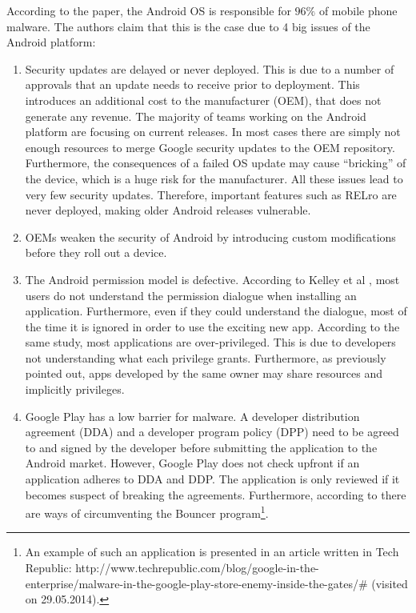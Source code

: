 According to the paper, the Android OS is responsible for $96\%$ of mobile phone malware. The authors claim that this is the case due to 4 big issues of the Android platform:
\begin{enumerate}
	\item Security updates are delayed or never deployed. This is due to a number of approvals that an update needs to receive prior to deployment. This introduces an additional cost to the manufacturer (OEM), that does not generate any revenue. The majority of teams working on the Android platform are focusing on current releases. In most cases there are simply not enough resources to merge Google security updates to the OEM repository. Furthermore, the consequences of a failed OS update may cause ``bricking'' of the device, which is a huge risk for the manufacturer. All these issues lead to very few security updates. Therefore, important features such as RELro are never deployed, making older Android releases vulnerable.
	
	\item OEMs weaken the security of Android by introducing custom modifications before they roll out a device.
	
	\item The Android permission model is defective. According to Kelley et al \cite{kelley2012conundrum}, most users do not understand the permission dialogue when installing an application. Furthermore, even if they could understand the dialogue, most of the time it is ignored in order to use the exciting new app. According to the same study, most applications are over-privileged. This is due to developers not understanding what each privilege grants. Furthermore, as previously pointed out, apps developed by the same owner may share resources and implicitly privileges.
	
	\item Google Play has a low barrier for malware. A developer distribution agreement (DDA) and a developer program policy (DPP) need to be agreed to and signed by the developer before submitting the application to the Android market. However, Google Play does not check upfront if an application adheres to DDA and DDP. The application is only reviewed if it becomes suspect of breaking the agreements. Furthermore, according to \cite{percoco2012adventures} there are ways of circumventing the Bouncer program\footnote{An example of such an application is presented in an article written in Tech Republic: http://www.techrepublic.com/blog/google-in-the-enterprise/malware-in-the-google-play-store-enemy-inside-the-gates/\# (visited on 29.05.2014).}. 
\end{enumerate}

